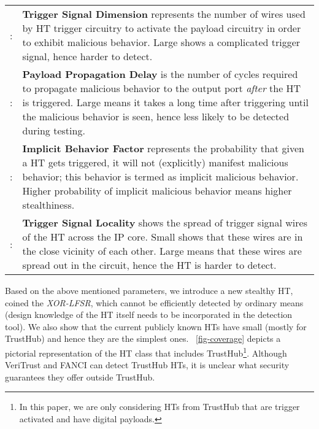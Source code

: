 \documentclass[10pt,journal,compsoc]{IEEEtran}
\begin{document}
{
\vspace{6pt}
\renewcommand{\arraystretch}{1.3}
\centering
\begin{tabular}{c p{}} : &  \textbf{Trigger Signal Dimension} represents the number of wires used by HT trigger circuitry to activate the payload circuitry in order to exhibit malicious behavior. Large  shows a complicated trigger signal, hence harder to detect. \\ : & \textbf{Payload Propagation Delay} is the number of cycles required to propagate malicious behavior to the output port \textit{after} the HT is triggered. Large  means it takes a long time after triggering until the malicious behavior is seen, hence less likely to be detected during testing. \\ : & \textbf{Implicit Behavior Factor} represents the probability that given a HT gets triggered, it will not (explicitly) manifest malicious behavior; this behavior is termed as implicit malicious behavior. Higher probability of implicit malicious behavior means higher stealthiness. \\ :  & \textbf{Trigger Signal Locality} shows the spread of trigger signal wires of the HT across the IP core. Small  shows that these wires are in the close vicinity of each other. Large  means that these wires are spread out in the circuit, hence the HT is harder to detect. \\ \end{tabular}
\vspace{3pt}
}






Based on the above mentioned parameters, we introduce a new stealthy HT, coined the \textit{XOR-LFSR}, which cannot be efficiently detected by ordinary means (design knowledge of the HT itself needs to be incorporated in the detection tool).
We also show that the current publicly known HTs have small  (mostly  for TrustHub) and hence they are the simplest ones.
\figurename~\ref{fig-coverage} depicts a pictorial representation of the HT class  that includes TrustHub\footnote{In this paper, we are only considering HTs from TrustHub that are trigger activated and have digital payloads.}.
Although VeriTrust and FANCI can detect TrustHub HTs, it is unclear what security guarantees they offer outside TrustHub.
\end{document}
